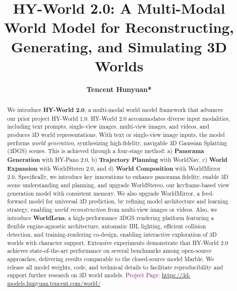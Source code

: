 \documentclass{article} %
\title{HY-World 2.0: A Multi-Modal World Model for Reconstructing, Generating, and Simulating 3D Worlds}
\author{\textbf{Tencent Hunyuan*}}
\begin{document}
\maketitle

\makeatletter
\let\original@makefnmark\@makefnmark  %
\makeatother

\makeatletter
\def\@makefnmark{}
\makeatother
{}

\makeatletter
\let\@makefnmark\original@makefnmark  %
\makeatother

\begin{abstract}

We introduce \textbf{HY-World 2.0}, a multi-modal world model framework that advances our prior project {HY-World 1.0}. 
HY-World 2.0 accommodates diverse input modalities, including text prompts, single-view images, multi-view images, and videos, and produces 3D world representations.
With text or single-view image inputs, the model performs \emph{world generation}, synthesizing high-fidelity, navigable 3D Gaussian Splatting (3DGS) scenes. 
This is achieved through a four-stage method: a) \textcolor[HTML]{4285F4}{\textbf{Panorama Generation}} with HY-Pano 2.0, b) \textcolor[HTML]{34A853}{\textbf{Trajectory Planning}} with WorldNav, c) \textcolor[HTML]{FBBC05}{\textbf{World Expansion}} with WorldStereo 2.0, and d) \textcolor[HTML]{EA4335}{\textbf{World Composition}} with WorldMirror 2.0.
Specifically, we introduce key innovations to enhance panorama fidelity, enable 3D scene understanding and planning, and upgrade WorldStereo, our keyframe-based view generation model with consistent memory. 
We also upgrade WorldMirror, a feed-forward model for universal 3D prediction, by refining model architecture and learning strategy, enabling \emph{world reconstruction} from  multi-view images or videos. 
Also, we introduce \textcolor[HTML]{7B1FA2}{\textbf{WorldLens}}, a high-performance 3DGS rendering platform featuring a flexible engine-agnostic architecture, automatic IBL lighting, efficient collision detection, and training-rendering co-design, enabling interactive exploration of 3D worlds with character support.
Extensive experiments demonstrate that HY-World 2.0 achieves state-of-the-art performance on several benchmarks among open-source approaches, delivering results comparable to the closed-source model Marble. We release all model weights, code, and technical details to facilitate reproducibility and support further research on 3D world models. 
\textcolor{purple}{Project Page: \url{https://3d-models.hunyuan.tencent.com/world/}}
\end{abstract}
\end{document}
